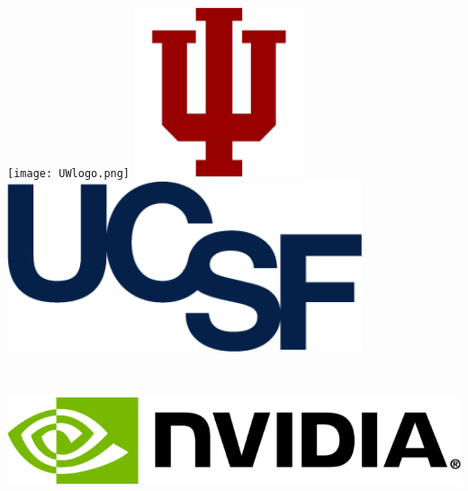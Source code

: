 \documentclass[a0, landscape]{a0poster}
\begin{document}
\begin{minipage}[b]{0.4\linewidth}

\texttt{[image: UWlogo.png]}
\includegraphics[height=5cm]{iulogo.jpeg}
\includegraphics[height=5cm]{UCSFlogo.png}
\includegraphics[height=5cm]{Nvidia_logo.png}

\end{minipage}

\vspace{0.5cm} %

\end{document}
